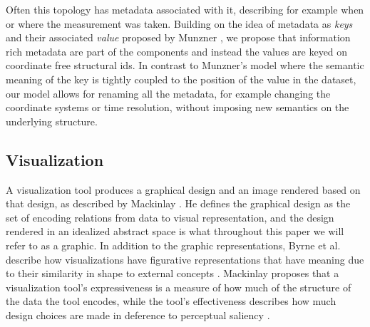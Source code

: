 \documentclass[../main.tex]{subfiles}
\begin{document}
Often this topology has metadata associated with it, describing for example when or where the measurement was taken. Building on the idea of metadata as \textit{keys} and their associated \textit{value} proposed by Munzner \cite{munznerChDataAbstraction}, we propose that information rich metadata are part of the components and instead the values are keyed on coordinate free structural ids. In contrast to Munzner's model where the semantic meaning of the key is tightly coupled to the position of the value in the dataset, our model allows for renaming all the metadata, for example changing the coordinate systems or time resolution, without imposing new semantics on the underlying structure.

\subsection{Visualization}
A visualization tool produces a graphical design and an image rendered based on that design, as described by Mackinlay \cite{mackinlayAUTOMATICDESIGNGRAPHICAL1987}. He defines the graphical design as the set of encoding relations from data to visual representation\cite{mackinlayAutomatingDesignGraphical1986}, and the design rendered in an idealized abstract space is what throughout this paper we will refer to as a graphic. In addition to the graphic representations, Byrne et al. describe how visualizations have figurative representations that have meaning due to their similarity in shape to external concepts \cite{byrneAcquiredCodesMeaning2016}. Mackinlay  proposes that a visualization tool's expressiveness is a measure of how much of the structure of the data the tool encodes, while the tool's effectiveness describes how much design choices are made in deference to perceptual saliency \cite{clevelandResearchStatisticalGraphics1987,clevelandGraphicalPerceptionTheory1984,chambersGraphicalMethodsData1983a, munznerVisualizationAnalysisDesign2014}.
\end{document}
